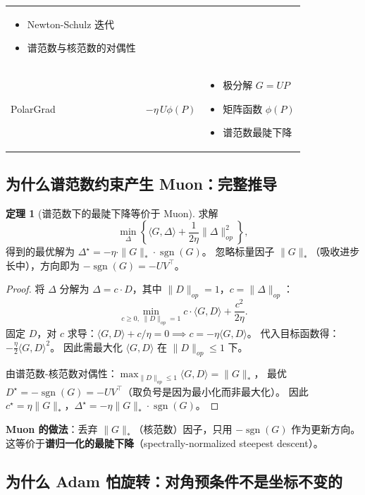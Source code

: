 \documentclass[12pt,a4paper]{ctexart}
\theoremstyle{definition}
\newtheorem{theorem}{定理}[section]
\theoremstyle{plain}
\DeclareMathOperator{\sgn}{sgn}
\begin{document}
\begin{center}
\begin{tabular}{lll}
{\begin{itemize}
    \item Newton-Schulz 迭代
    \item 谱范数与核范数的对偶性
  \end{itemize}} \\
PolarGrad & $-\eta\,U\phi(P)$ &
  \parbox{6cm}{\vspace{-0.3cm}\begin{itemize}
    \item 极分解 $G=UP$
    \item 矩阵函数 $\phi(P)$
    \item 谱范数最陡下降
  \end{itemize}} \\
\bottomrule
\end{tabular}
\end{center}

\subsection{为什么谱范数约束产生 Muon：完整推导}

\begin{theorem}[谱范数下的最陡下降等价于 Muon]
  求解
  \[
    \min_{\Delta} \left\{\langle G, \Delta\rangle + \frac{1}{2\eta}\|\Delta\|_{op}^2\right\},
  \]
  得到的最优解为 $\Delta^\star = -\eta\cdot\|G\|_*\cdot\sgn(G)$。
  忽略标量因子 $\|G\|_*$（吸收进步长中），方向即为 $-\sgn(G) = -UV^\top$。
\end{theorem}

\begin{proof}
  将 $\Delta$ 分解为 $\Delta=c\cdot D$，其中 $\|D\|_{op}=1$，$c=\|\Delta\|_{op}$：
  \[
    \min_{c\ge0,\;\|D\|_{op}=1} c\cdot\langle G,D\rangle + \frac{c^2}{2\eta}.
  \]
  固定 $D$，对 $c$ 求导：$\langle G,D\rangle + c/\eta = 0 \implies c = -\eta\langle G,D\rangle$。
  代入目标函数得：$-\frac{\eta}{2}\langle G,D\rangle^2$。
  因此需最大化 $\langle G,D\rangle$ 在 $\|D\|_{op}\le1$ 下。

  由谱范数-核范数对偶性：$\max_{\|D\|_{op}\le1}\langle G,D\rangle = \|G\|_*$，
  最优 $D^\star = -\sgn(G) = -UV^\top$（取负号是因为最小化而非最大化）。
  因此 $c^\star = \eta\|G\|_*$，$\Delta^\star = -\eta\|G\|_*\cdot\sgn(G)$。
\end{proof}

\textbf{Muon 的做法}：丢弃 $\|G\|_*$（核范数）因子，只用 $-\sgn(G)$ 作为更新方向。
这等价于\textbf{谱归一化的最陡下降}（spectrally-normalized steepest descent）。

\subsection{为什么 Adam 怕旋转：对角预条件不是坐标不变的}
\end{document}

